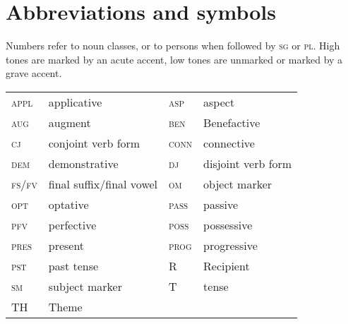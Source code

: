 \documentclass[output=paper
,modfonts
,nonflat]{langsci/langscibook}
\begin{document}
\section*{Abbreviations and symbols}
Numbers refer to noun classes, or to persons when followed by \textsc{sg} or \textsc{pl}. High tones are marked by an acute accent, low tones are unmarked or marked by a grave accent.
\begin{table}
\noindent \begin{tabular}{llll} 	
		\textsc{appl} 	& applicative 					& \textsc{asp} 	& aspect \\ 	
		\textsc{aug} 	& augment 						& \textsc{ben} 	& Benefactive \\	
		\textsc{cj} 	& conjoint verb form 			& \textsc{conn} & connective \\	
		\textsc{dem}	& demonstrative 				& \textsc{dj} 	& disjoint verb form \\ 
		\textsc{fs/fv} 	& final suffix/final vowel 		& \textsc{om} 	& object marker \\	
		\textsc{opt}	& optative 						& \textsc{pass} & passive \\	
		\textsc{pfv} 	& perfective 					& \textsc{poss} & possessive \\	
		\textsc{pres} 	& present 						& \textsc{prog} & progressive \\	
		\textsc{pst} 	& past tense 					& R 			& Recipient \\	
		\textsc{sm} 	& subject marker 				& T 			& tense \\	
		TH 				& Theme 						&				&
	\end{tabular}		
\end{table}

\sloppy
\printbibliography[heading=subbibliography,notkeyword=this]
\end{document}
